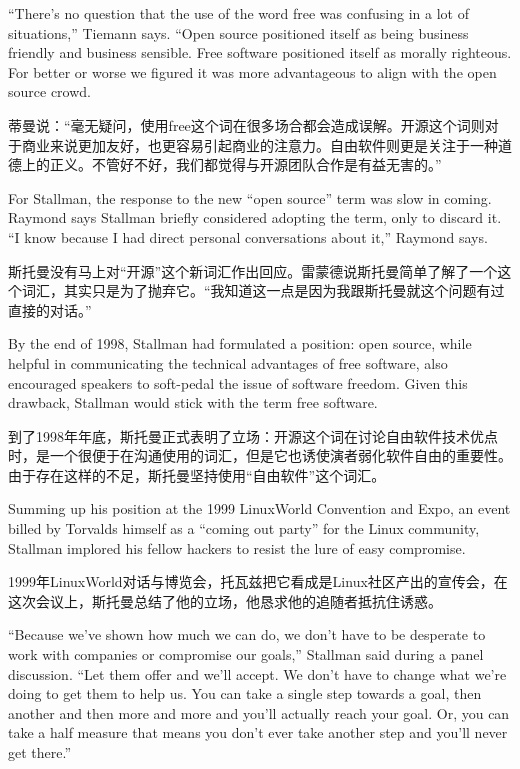 \ifdefined\eng
``There's no question that the use of the word free was confusing in a lot of situations,'' Tiemann says. ``Open source positioned itself as being business friendly and business sensible. Free software positioned itself as morally righteous. For better or worse we figured it was more advantageous to align with the open source crowd.
\fi

\ifdefined\chs
蒂曼说：“毫无疑问，使用free这个词在很多场合都会造成误解。开源这个词则对于商业来说更加友好，也更容易引起商业的注意力。自由软件则更是关注于一种道德上的正义。不管好不好，我们都觉得与开源团队合作是有益无害的。”
\fi

\ifdefined\eng
For Stallman, the response to the new ``open source'' term was slow in coming. Raymond says Stallman briefly considered adopting the term, only to discard it. ``I know because I had direct personal conversations about it,'' Raymond says.
\fi

\ifdefined\chs
斯托曼没有马上对“开源”这个新词汇作出回应。雷蒙德说斯托曼简单了解了一个这个词汇，其实只是为了抛弃它。“我知道这一点是因为我跟斯托曼就这个问题有过直接的对话。”
\fi

\ifdefined\eng
By the end of 1998, Stallman had formulated a position: open source, while helpful in communicating the technical advantages of free software, also encouraged speakers to soft-pedal the issue of software freedom. Given this drawback, Stallman would stick with the term free software.
\fi

\ifdefined\chs
到了1998年年底，斯托曼正式表明了立场：开源这个词在讨论自由软件技术优点时，是一个很便于在沟通使用的词汇，但是它也诱使演者弱化软件自由的重要性。由于存在这样的不足，斯托曼坚持使用“自由软件”这个词汇。
\fi

\ifdefined\eng
Summing up his position at the 1999 LinuxWorld Convention and Expo, an event billed by Torvalds himself as a ``coming out party'' for the Linux community, Stallman implored his fellow hackers to resist the lure of easy compromise.
\fi

\ifdefined\chs
1999年LinuxWorld对话与博览会，托瓦兹把它看成是Linux社区产出的宣传会，在这次会议上，斯托曼总结了他的立场，他恳求他的追随者抵抗住诱惑。
\fi

\ifdefined\eng
``Because we've shown how much we can do, we don't have to be desperate to work with companies or compromise our goals,'' Stallman said during a panel discussion. ``Let them offer and we'll accept. We don't have to change what we're doing to get them to help us. You can take a single step towards a goal, then another and then more and more and you'll actually reach your goal. Or, you can take a half measure that means you don't ever take another step and you'll never get there.''
\fi

